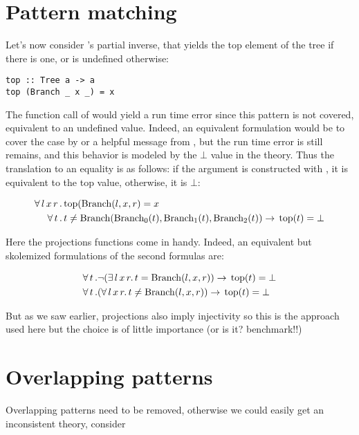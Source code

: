 \section{Pattern matching}

Let's now consider 's partial inverse,  that
yields the top element of the tree if there is one, or is undefined
otherwise:

\begin{verbatim}
top :: Tree a -> a
top (Branch _ x _) = x
\end{verbatim}

The function call of  would yield a run time error
since this pattern is not covered, equivalent to an undefined
value. Indeed, an equivalent formulation would be to cover the
 case by  or a helpful message from
, but the run time error is still remains, and this
behavior is modeled by the $\bot$ value in the theory. Thus the
translation to an equality is as follows: if the argument is
constructed with , it is equivalent to the top value,
otherwise, it is $\bot$:

\begin{align*}
 \forall \, l \, x \, r \, & . \, \mathrm{top}(\mathrm{Branch}(l,x,r) = x\\
 \forall \, t \, & . \, t \neq
 \mathrm{Branch}(\mathrm{Branch_{0}}(t),\mathrm{Branch_{1}}(t),\mathrm{Branch_{2}}(t))
 \rightarrow \, \mathrm{top}(t)  = \mathrm{\bot}
\end{align*}

Here the projections functions come in handy. Indeed, an equivalent
but skolemized formulations of the second formulas are:

\begin{align*}
 \forall \, t \, & . \neg (\exists \, l \, x \, r . \, t =
 \mathrm{Branch}(l,x,r))
 \rightarrow \, \mathrm{top}(t) = \bot \\
 \forall \, t \, & . (\forall \, l \, x \, r . \, t \neq
 \mathrm{Branch}(l,x,r))
 \rightarrow \, \mathrm{top}(t) = \bot
\end{align*}

But as we saw earlier, projections also imply injectivity so this is
the approach used here but the choice is of little importance (or is
it? benchmark!!)

\section{Overlapping patterns}

Overlapping patterns need to be removed, otherwise we could easily get
an inconsistent theory, consider

